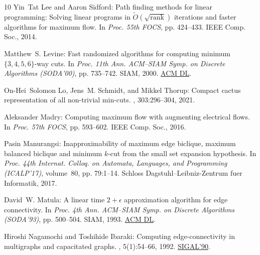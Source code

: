 \documentclass[11pt]{article}
\numberwithin{equation}{section}
\theoremstyle{definition}
\theoremstyle{plain}
\begin{document}
\begin{thebibliography}{10}
{\sc Yin~Tat Lee and Aaron Sidford}: Path finding methods for linear
  programming: Solving %
  linear programs in $\tilde{O}(\sqrt{\mathrm{rank}})$ iterations and faster
  algorithms for maximum flow.
\newblock In {\em Proc. 55th FOCS}, pp. 424--433. IEEE Comp. Soc., 2014.

{\sc Matthew~S. Levine}: Fast randomized algorithms for computing minimum
  $\{3,4,5,6\}$-way cuts.
\newblock In {\em Proc. 11th Ann. ACM--SIAM Symp. on Discrete Algorithms
  (SODA'00)}, pp. 735--742. SIAM, 2000.
\newblock \href{https://dl.acm.org/doi/10.5555/338219.338633}{ACM DL}.

{\sc On{-}Hei~Solomon Lo, Jens~M. Schmidt, and Mikkel Thorup}: Compact cactus
  representation of all non-trivial min-cuts.
, 303:296--304, 2021.

{\sc Aleksander Madry}: Computing maximum flow with augmenting electrical
  flows.
\newblock In {\em Proc. 57th FOCS}, pp. 593--602. IEEE Comp. Soc., 2016.

{\sc Pasin Manurangsi}: Inapproximability of maximum edge biclique, maximum
  balanced biclique and minimum $k$-cut from the small set expansion
  hypothesis.
\newblock In {\em Proc. 44th Internat. Colloq. on Automata, Languages, and
  Programming (ICALP'17)}, volume~80, pp. 79:1--14. Schloss
  Dagstuhl--Leibniz-Zentrum fuer Informatik, 2017.

{\sc David~W. Matula}: A linear time $2+\epsilon$ approximation algorithm for
  edge connectivity.
\newblock In {\em Proc. 4th Ann. ACM--SIAM Symp. on Discrete Algorithms
  (SODA'93)}, pp. 500--504. SIAM, 1993.
\newblock \href{https://dl.acm.org/doi/10.5555/313559.313872}{ACM DL}.

{\sc Hiroshi Nagamochi and Toshihide Ibaraki}: Computing edge-connectivity in
  multigraphs and capacitated graphs.
, 5(1):54--66, 1992.
\newblock \prelim \href{https://doi.org/10.1007/3-540-52921-7\_51}{SIGAL'90}.
\newblock [\epfmtdoi{10.1137/0405004}]


\end{thebibliography}
\end{document}
